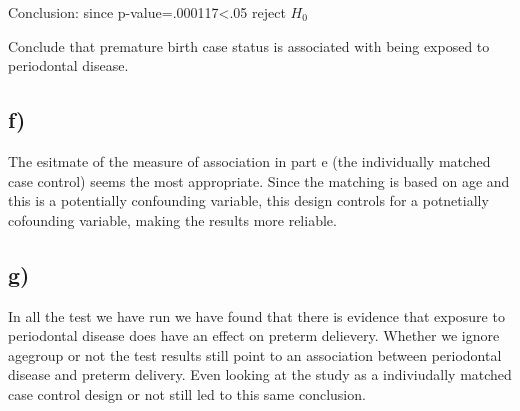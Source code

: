 \documentclass[]{article}
\begin{document}
Conclusion: since p-value=.000117\textless{}.05 reject \(H_0\)

Conclude that premature birth case status is associated with being
exposed to periodontal disease.

\subsection{f)}\label{f-1}

The esitmate of the measure of association in part e (the individually
matched case control) seems the most appropriate. Since the matching is
based on age and this is a potentially confounding variable, this design
controls for a potnetially cofounding variable, making the results more
reliable.

\subsection{g)}\label{g-1}

In all the test we have run we have found that there is evidence that
exposure to periodontal disease does have an effect on preterm
delievery. Whether we ignore agegroup or not the test results still
point to an association between periodontal disease and preterm
delivery. Even looking at the study as a indiviudally matched case
control design or not still led to this same conclusion.
\end{document}

